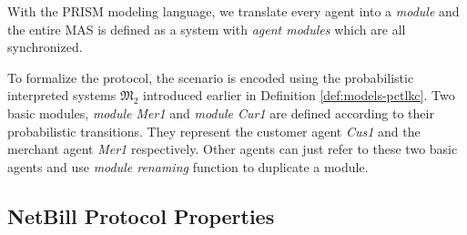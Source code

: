 With the PRISM modeling language, we translate every agent into a
\emph{module} and the entire MAS is defined as a system with \emph{agent modules} which are all synchronized.


To formalize the protocol, the scenario is encoded using the
probabilistic interpreted systems $\mathfrak{M_2}$ introduced earlier in Definition \ref{def:models-pctlkc}. Two basic modules, \emph{module
Mer1} and \emph{module Cur1} are defined according to their
probabilistic transitions. They represent the customer agent
\emph{Cus1} and the merchant agent \emph{Mer1} respectively. Other
agents can just refer to these two basic agents and use
\emph{module renaming} function to duplicate a module.

\subsection{NetBill Protocol Properties}

